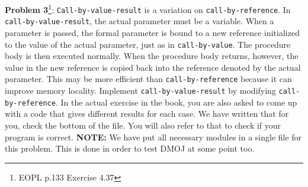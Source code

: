 \documentclass[12pt,reqno]{amsart}
\newcommand{\code}[1]{\texttt{#1}}
\begin{document}
\vspace{7.5mm}

\textbf{Problem 3}\footnote{EOPL p.133  Exercise 4.37}: \code{Call-by-value-result} is a variation on \code{call-by-reference}. In \code{call-by-value-result}, the actual parameter must be a variable. When a parameter is passed, the formal parameter is bound to a new reference initialized to the value of the actual parameter, just as in \code{call-by-value}. The procedure body is then executed normally. When the procedure body returns, however, the value in the new reference is copied back into the reference denoted by the actual parameter. This may be more efficient than \code{call-by-reference} because it can improve memory locality. Implement \code{call-by-value-result} by modifying \code{call-by-reference}. In the actual exercise in the book, you are also asked to come up with a code that gives different results for each case. We have written that for you, check the bottom of the file. You will also refer to that to check if your program is correct.
\textbf{NOTE:} We have put all necessary modules in a single file for this problem. This is done in order to test DMOJ at some point too.
\end{document}
